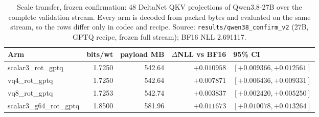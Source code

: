 \begin{table}[t]
\centering
\small
\begin{tabular}{lrrrl}
\toprule
Arm & bits/wt & payload MB & $\Delta$NLL vs BF16 & 95\% CI \\
\midrule
scalar3\_rot\_gptq & 1.7250 & 542.64 & $+0.010958$ & $[+0.009366, +0.012561]$ \\
vq4\_rot\_gptq & 1.7250 & 542.64 & $+0.007871$ & $[+0.006436, +0.009331]$ \\
vq8\_rot\_gptq & 1.7253 & 542.74 & $+0.003837$ & $[+0.002420, +0.005250]$ \\
scalar3\_g64\_rot\_gptq & 1.8500 & 581.96 & $+0.011673$ & $[+0.010078, +0.013264]$ \\
\bottomrule
\end{tabular}
\caption{Scale transfer, frozen confirmation: 48 DeltaNet QKV projections of Qwen3.8-27B over the complete validation stream. Every arm is decoded from packed bytes and evaluated on the same stream, so the rows differ only in codec and recipe. Source: \texttt{results/qwen38\_confirm\_v2} (27B, GPTQ recipe, frozen full stream); BF16 NLL 2.691117.}
\label{tab:q27}
\end{table}
